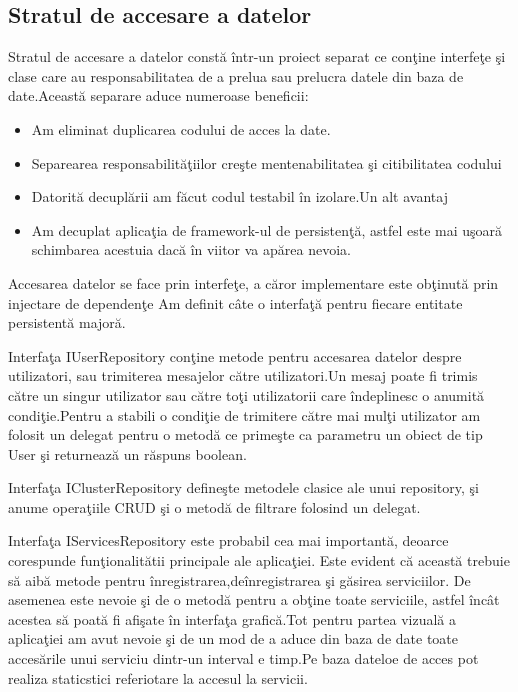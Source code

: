 \documentclass[a4paper,12pt]{report}
\begin{document}
\pagebreak

\subsection{Stratul de accesare a datelor}

Stratul de accesare a datelor const\u a \^intr-un proiect separat ce con\c tine interfe\c te \c si clase 
 care au responsabilitatea de a prelua sau prelucra datele din baza de date.Aceast\u a separare aduce numeroase
 beneficii:
 \begin{itemize}
	 \item Am eliminat duplicarea codului de acces la date.
	 \item Separearea responsabilit\u a\c tiilor cre\c ste mentenabilitatea \c si citibilitatea codului
	 \item Datorit\u a decupl\u arii am f\u acut codul testabil \^in izolare.Un alt avantaj
	 \item Am decuplat aplica\c tia de framework-ul de persisten\c t\u a, astfel este mai u\c soar\u a schimbarea
	 	acestuia dac\u a \^in viitor va ap\u area nevoia. 
 \end{itemize}
 
Accesarea datelor se face prin interfe\c te, a c\u aror implementare este ob\c tinut\u a prin injectare de dependen\c te
Am definit c\^ate o interfa\c t\u a pentru fiecare entitate persistent\u a major\u a.

Interfa\c ta IUserRepository con\c tine 
metode pentru accesarea datelor despre utilizatori, sau trimiterea mesajelor c\u atre utilizatori.Un mesaj poate fi trimis c\u atre 
un singur utilizator sau c\u atre to\c ti utilizatorii care \^indeplinesc o anumit\u a condi\c tie.Pentru a stabili o condi\c tie 
de trimitere c\u atre mai mul\c ti utilizator am folosit un delegat pentru o metod\u a ce prime\c ste ca parametru un obiect de tip 
User \c si returneaz\u a un r\u aspuns boolean.

Interfa\c ta IClusterRepository define\c ste metodele clasice ale unui repository, \c si anume opera\c tiile CRUD \c si o metod\u a de
filtrare folosind un delegat.

Interfa\c ta IServicesRepository este probabil cea mai important\u a, deoarce corespunde fun\c tionalit\u atii principale ale aplica\c tiei.
Este evident c\u a aceast\u a trebuie s\u a aib\u a metode pentru \^inregistrarea,de\^inregistrarea \c si g\u asirea serviciilor.
De asemenea este nevoie \c si de o metod\u a pentru a ob\c tine toate serviciile, astfel \^inc\^at acestea s\u a poat\u a fi 
afi\c sate \^in interfa\c ta grafic\u a.Tot pentru partea vizual\u a a aplica\c tiei am avut nevoie \c si de un mod de a aduce 
din baza de date toate acces\u arile unui serviciu dintr-un interval e timp.Pe baza dateloe de acces pot realiza staticstici referiotare
la accesul la servicii.
\end{document}

